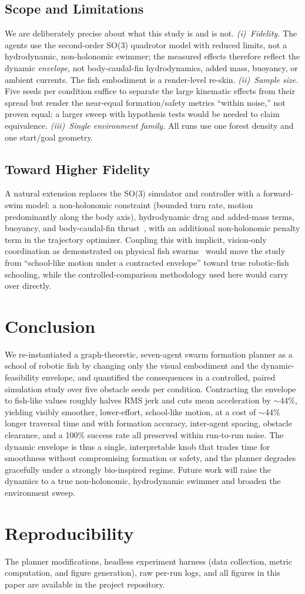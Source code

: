 \documentclass[journal]{IEEEtran}
\begin{document}
\subsection{Scope and Limitations}
We are deliberately precise about what this study is and is not.
\emph{(i)~Fidelity.} The agents use the second-order SO(3) quadrotor model
with reduced limits, not a hydrodynamic, non-holonomic swimmer; the measured
effects therefore reflect the dynamic \emph{envelope}, not body-caudal-fin
hydrodynamics, added mass, buoyancy, or ambient currents. The fish embodiment
is a render-level re-skin. \emph{(ii)~Sample size.} Five seeds per condition
suffice to separate the large kinematic effects from their spread but render
the near-equal formation/safety metrics ``within noise,'' not proven equal; a
larger sweep with hypothesis tests would be needed to claim equivalence.
\emph{(iii)~Single environment family.} All runs use one forest density and
one start/goal geometry.

\subsection{Toward Higher Fidelity}
A natural extension replaces the SO(3) simulator and controller with a
forward-swim model: a non-holonomic constraint (bounded turn rate, motion
predominantly along the body axis), hydrodynamic drag and added-mass terms,
buoyancy, and body-caudal-fin thrust~\cite{lighthill1971large}, with an
additional non-holonomic penalty term in the trajectory optimizer. Coupling
this with implicit, vision-only coordination as demonstrated on physical fish
swarms~\cite{berlinger2021implicit} would move the study from
``school-like motion under a contracted envelope'' toward true robotic-fish
schooling, while the controlled-comparison methodology used here would carry
over directly.

\section{Conclusion}
\label{sec:conclusion}
We re-instantiated a graph-theoretic, seven-agent swarm formation planner as a
school of robotic fish by changing only the visual embodiment and the
dynamic-feasibility envelope, and quantified the consequences in a controlled,
paired simulation study over five obstacle seeds per condition. Contracting
the envelope to fish-like values roughly halves RMS jerk and cuts mean
acceleration by $\sim$44\%, yielding visibly smoother, lower-effort,
school-like motion, at a cost of $\sim$44\% longer traversal time and with
formation accuracy, inter-agent spacing, obstacle clearance, and a 100\%
success rate all preserved within run-to-run noise. The dynamic envelope is
thus a single, interpretable knob that trades time for smoothness without
compromising formation or safety, and the planner degrades gracefully under a
strongly bio-inspired regime. Future work will raise the dynamics to a true
non-holonomic, hydrodynamic swimmer and broaden the environment sweep.

\section*{Reproducibility}
The planner modifications, headless experiment harness (data collection,
metric computation, and figure generation), raw per-run logs, and all figures
in this paper are available in the project repository.



\end{document}
